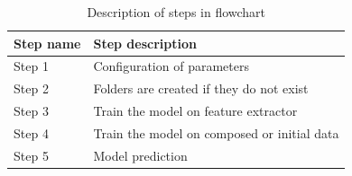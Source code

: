 \begin{table}[!ht]
  \centering
    \begin{tabular}{ |m{12em}|m{20em}| } 
     \hline
        Step name & Step description \\ 
     \hline
        Step 1 & Configuration of parameters \\ 
     \hline
        Step 2 & Folders are created if they do not exist \\
     \hline
        Step 3 & Train the model on feature extractor \\
     \hline
        Step 4 & Train the model on composed or initial data\\
     \hline
        Step 5 & Model prediction\\
     \hline
    \end{tabular}
\caption{Description of steps in flowchart}
\end{table}
